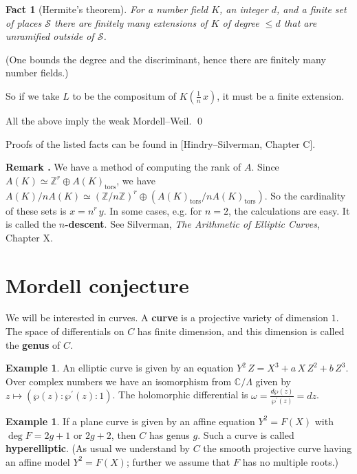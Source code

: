 \documentclass{article}
\newtheorem{fact}[proposition]{Fact}
\theoremstyle{definition}
\newtheorem{example}[proposition]{Example}
\newcommand{\isom}{\simeq}
\newcommand{\term}{\textbf}
\newcommand{\ZZ}{\mathbb{Z}}
\newcommand{\CC}{\mathbb{C}}
\newenvironment{remark}
{ \begin{shaded}\begingroup\small\noindent\refstepcounter{proposition}\textbf{Remark \theproposition.} }
{ \endgroup\end{shaded} }
\begin{document}
\begin{fact}[Hermite's theorem]
  \label{fact:hermite-theorem}
  For a number field $K$, an integer $d$, and a finite set of places
  $\mathcal{S}$ there are finitely many extensions of $K$ of degree $\le d$ that
  are unramified outside of $\mathcal{S}$.
\end{fact}

\noindent (One bounds the degree and the discriminant, hence there are finitely
many number fields.)

So if we take $L$ to be the compositum of $K (\frac{1}{n} \, x)$, it must be a
finite extension.

All the above imply the weak Mordell--Weil. \qed

Proofs of the listed facts can be found in [Hindry--Silverman, Chapter C].

\begin{remark}
  We have a method of computing the rank of $A$. Since
  $A (K) \isom \ZZ^r \oplus A (K)_\mathrm{tors}$, we have
  $A(K)/n A(K) \isom (\ZZ/n\ZZ)^r \oplus (A (K)_\mathrm{tors} / n A (K)_\mathrm{tors})$.
  So the cardinality of these sets is $x = n^r \, y$.
  In some cases, e.g. for $n = 2$, the calculations are easy. It is called the
  \term{$n$-descent}. See Silverman, \emph{The Arithmetic of Elliptic Curves},
  Chapter X.
\end{remark}

\section{Mordell conjecture}
\label{section:mordell}

We will be interested in curves. A \term{curve} is a projective variety of
dimension $1$. The space of differentials on $C$ has finite dimension, and this
dimension is called the \term{genus} of $C$.

\begin{example}
  An elliptic curve is given by an equation
  $Y^2\,Z = X^3 + a\,X\,Z^2 + b\,Z^3$. Over complex numbers we have an
  isomorphism from $\CC/\Lambda$ given by
  $z \mapsto (\wp (z) : \wp^\prime (z) : 1)$. The holomorphic differential is
  $\omega = \frac{d \wp (z)}{\wp^\prime (z)} = dz$.
\end{example}

\begin{example}
  If a plane curve is given by an affine equation $Y^2 = F (X)$ with
  $\deg F = 2g+1$ or $2g+2$, then $C$ has genus $g$. Such a curve is called
  \term{hyperelliptic}. (As usual we understand by $C$ the smooth projective
  curve having an affine model $Y^2 = F (X)$; further we assume that $F$ has no
  multiple roots.)
\end{example}
\end{document}
